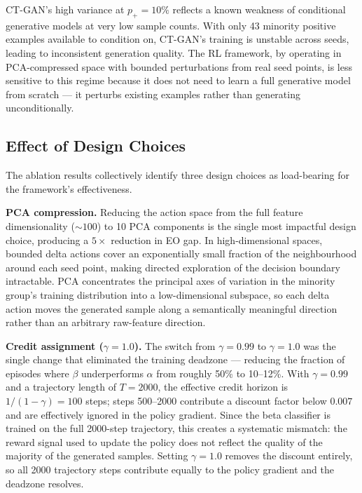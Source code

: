 CT-GAN's high variance at $p_+ = 10\%$ reflects a known weakness of
conditional generative models at very low sample counts.
With only 43 minority positive examples available to condition on, CT-GAN's
training is unstable across seeds, leading to inconsistent generation quality.
The RL framework, by operating in PCA-compressed space with bounded
perturbations from real seed points, is less sensitive to this regime because
it does not need to learn a full generative model from scratch — it perturbs
existing examples rather than generating unconditionally.

\subsection{Effect of Design Choices}

The ablation results collectively identify three design choices as load-bearing
for the framework's effectiveness.

\textbf{PCA compression.}
Reducing the action space from the full feature dimensionality (${\sim}100$)
to 10 PCA components is the single most impactful design choice, producing a
$5\times$ reduction in EO gap.
In high-dimensional spaces, bounded delta actions cover an exponentially small
fraction of the neighbourhood around each seed point, making directed
exploration of the decision boundary intractable.
PCA concentrates the principal axes of variation in the minority group's
training distribution into a low-dimensional subspace, so each delta action
moves the generated sample along a semantically meaningful direction rather
than an arbitrary raw-feature direction.

\textbf{Credit assignment ($\gamma = 1.0$).}
The switch from $\gamma = 0.99$ to $\gamma = 1.0$ was the single change that
eliminated the training deadzone — reducing the fraction of episodes where
$\beta$ underperforms $\alpha$ from roughly 50\% to 10--12\%.
With $\gamma = 0.99$ and a trajectory length of $T = 2000$, the effective
credit horizon is $1/(1-\gamma) = 100$ steps; steps 500--2000 contribute a
discount factor below $0.007$ and are effectively ignored in the policy
gradient.
Since the beta classifier is trained on the full 2000-step trajectory, this
creates a systematic mismatch: the reward signal used to update the policy does
not reflect the quality of the majority of the generated samples.
Setting $\gamma = 1.0$ removes the discount entirely, so all 2000 trajectory
steps contribute equally to the policy gradient and the deadzone resolves.

